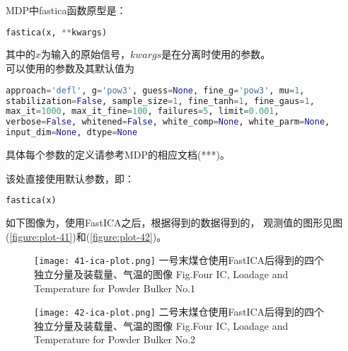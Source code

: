 MDP中fastica函数原型是：
\begin{lstlisting}[language=Python, basicstyle=\ttfamily]
fastica(x, **kwargs)
\end{lstlisting}
其中的$x$为输入的原始信号，$kwargs$是在分离时使用的参数。\\
可以使用的参数及其默认值为
\begin{lstlisting}[language=Python, basicstyle=\ttfamily]
approach='defl', g='pow3', guess=None, fine_g='pow3', mu=1, 
stabilization=False, sample_size=1, fine_tanh=1, fine_gaus=1,
max_it=1000, max_it_fine=100, failures=5, limit=0.001, 
verbose=False, whitened=False, white_comp=None, white_parm=None,
input_dim=None, dtype=None
\end{lstlisting}
具体每个参数的定义请参考MDP的相应文档(***)。

该处直接使用默认参数，即：
\begin{lstlisting}[language=Python, basicstyle=\ttfamily]
fastica(x)
\end{lstlisting}
如下图像为，使用FastICA之后，根据得到的数据得到的，
观测值的图形见图(\ref{figure:plot-41})和(\ref{figure:plot-42})。

\begin{figure}[!htbp]
   \centering
   \texttt{[image: 41-ica-plot.png]}
				    {一号末煤仓使用FastICA后得到的四个独立分量及装载量、气温的图像}
			{Fig.}{Four IC, Loadage and Temperature for Powder Bulker No.1}
\end{figure}

\begin{figure}[!htbp]
   \centering
   \texttt{[image: 42-ica-plot.png]}
				    {二号末煤仓使用FastICA后得到的四个独立分量及装载量、气温的图像}
			{Fig.}{Four IC, Loadage and Temperature for Powder Bulker No.2}
\end{figure}
\newpage

